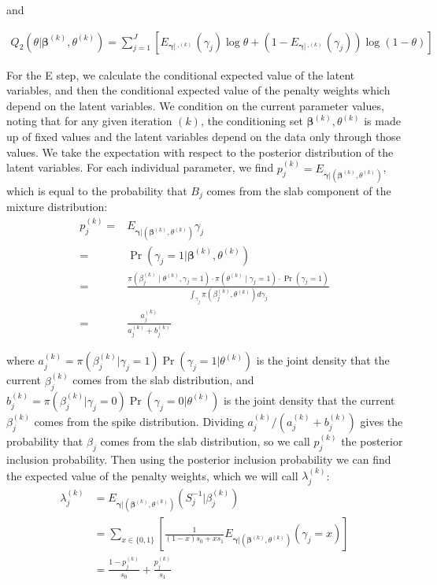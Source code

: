 \documentclass[11pt,a4paper]{article}
\begin{document}
and

\begin{align*}
    Q_2( \theta|\boldsymbol{\beta}^{(k)}, \theta^{(k)}) = \sum_{j=1}^{J}\left[E_{\boldsymbol{\gamma}|\cdot^{(k)}}(\gamma_j) \log \theta + (1 - E_{\boldsymbol{\gamma}|\cdot^{(k)}}(\gamma_j))\log(1 - \theta)\right]
\end{align*}


For the E step, we calculate the conditional expected value of the latent variables, and then the conditional expected value of the penalty weights which depend on the latent variables. We condition on the current parameter values, noting that for any given iteration $(k)$, the conditioning set $\boldsymbol{\beta}^{(k)}, \theta^{(k)}$ is made up of fixed values and the latent variables depend on the data only through those values. We take the expectation with respect to the posterior distribution of the latent variables. For each individual parameter, we find $p^{(k)}_j = E_{\boldsymbol{\gamma}|(\boldsymbol{\beta}^{(k)}, \theta^{(k)})}$, which is equal to the probability that $B_j$ comes from the slab component of the mixture distribution: 
\begin{align*}
     p^{(k)}_j = &E_{\boldsymbol{\gamma}|(\boldsymbol{\beta}^{(k)}, \theta^{(k)})}\gamma_j\\
     =& \Pr(\gamma_j = 1 | \boldsymbol{\beta}^{(k)}, \theta^{(k)})
     \\=  &  \frac{\pi(\beta_j^{(k)} \mid \theta^{(k)}, \gamma_j = 1) \cdot \pi(\theta^{(k)} \mid \gamma_j = 1) \cdot \Pr(\gamma_j = 1)}{\int_{\gamma_j} \pi(\beta_j^{(k)}, \theta^{(k)})d\gamma_j}
     \\=& \frac{a_j^{(k)}}{a_j^{(k)} + b_j^{(k)}}
\end{align*}

\noindent where $a_j^{(k)} = \pi(\beta_j^{(k)}| \gamma_j = 1)\Pr(\gamma_j = 1 | \theta^{(k)})$ is the joint density that the current $\beta_j^{(k)}$ comes from the slab distribution, and $b_j^{(k)} = \pi(\beta_j^{(k)}|\gamma_j = 0)\Pr(\gamma_j = 0 | \theta^{(k)})$ is the joint density that the current $\beta_j^{(k)}$ comes from the spike distribution. Dividing $a_j^{(k)} /(a_j^{(k)} + b_j^{(k)})$ gives the probability that $\beta_j$ comes from the slab distribution, so we call $p^{(k)}_j$ the posterior inclusion probability. Then using the posterior inclusion probability we can find the expected value of the penalty weights, which we will call $\lambda_j^{(k)}$:
\begin{align*}
    \lambda_j^{(k)} &= E_{\boldsymbol{\gamma}|(\boldsymbol{\beta}^{(k)}, \theta^{(k)})}(S^{-1 }_j|\beta_j^{(k)}) 
    \\& = \sum_{x \in \{0,1 \} }\left[\frac{1}{(1-x)s_0 + xs_1} E_{\boldsymbol{\gamma}|(\boldsymbol{\beta}^{(k)}, \theta^{(k)})}(\gamma_j = x)\right]
    \\ & = \frac{1-p^{(k)}_j}{s_0} + \frac{p^{(k)}_j}{s_1}
\end{align*}
\end{document}
